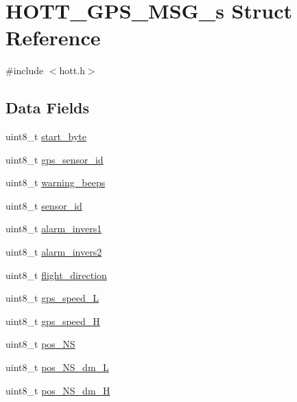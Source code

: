 \hypertarget{structHOTT__GPS__MSG__s}{\section{H\+O\+T\+T\+\_\+\+G\+P\+S\+\_\+\+M\+S\+G\+\_\+s Struct Reference}
\label{structHOTT__GPS__MSG__s}
}


{\ttfamily \#include $<$hott.\+h$>$}

\subsection*{Data Fields}
\begin{DoxyCompactItemize}
\item 
uint8\+\_\+t \hyperlink{structHOTT__GPS__MSG__s_a63a177ef2e9173dc4f9b39e7f124f507}{start\+\_\+byte}
\item 
uint8\+\_\+t \hyperlink{structHOTT__GPS__MSG__s_adffec05bad9801361586607c8cde8e37}{gps\+\_\+sensor\+\_\+id}
\item 
uint8\+\_\+t \hyperlink{structHOTT__GPS__MSG__s_a31a2608ff8cd95111adbf41c177c068c}{warning\+\_\+beeps}
\item 
uint8\+\_\+t \hyperlink{structHOTT__GPS__MSG__s_ab8565a887773a7e1bea29908940ba0cf}{sensor\+\_\+id}
\item 
uint8\+\_\+t \hyperlink{structHOTT__GPS__MSG__s_ad55e91bb3351baafa1a17a12c28efdda}{alarm\+\_\+invers1}
\item 
uint8\+\_\+t \hyperlink{structHOTT__GPS__MSG__s_a066be317becc95cd3c8a7bc3496d4520}{alarm\+\_\+invers2}
\item 
uint8\+\_\+t \hyperlink{structHOTT__GPS__MSG__s_a41d6a1387accbcb57d4a4c9863406af4}{flight\+\_\+direction}
\item 
uint8\+\_\+t \hyperlink{structHOTT__GPS__MSG__s_a033a25b163e4dfd5fd4f2db16d052b46}{gps\+\_\+speed\+\_\+\+L}
\item 
uint8\+\_\+t \hyperlink{structHOTT__GPS__MSG__s_ab58c894fd1e37dce4864f26350cef09f}{gps\+\_\+speed\+\_\+\+H}
\item 
uint8\+\_\+t \hyperlink{structHOTT__GPS__MSG__s_a334e559149f4209f5a8803d5052a0b5c}{pos\+\_\+\+N\+S}
\item 
uint8\+\_\+t \hyperlink{structHOTT__GPS__MSG__s_a85045742f0e05ddd4335a4c75f63fb12}{pos\+\_\+\+N\+S\+\_\+dm\+\_\+\+L}
\item 
uint8\+\_\+t \hyperlink{structHOTT__GPS__MSG__s_aafe8a83083aa67f773e22e7e6e2c272b}{pos\+\_\+\+N\+S\+\_\+dm\+\_\+\+H}

\end{DoxyCompactItemize}
